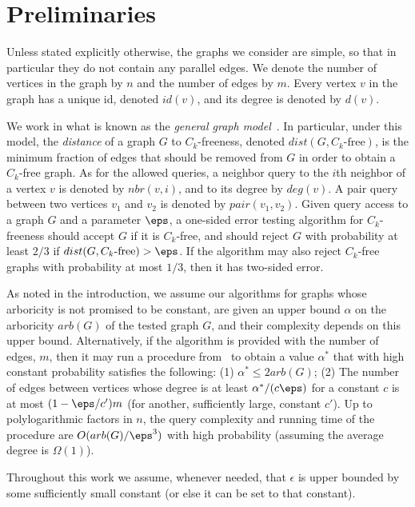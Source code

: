 \section{Preliminaries}\label{sec:prel}

Unless stated explicitly otherwise, the graphs we consider are simple, so that in particular they do not contain any parallel edges. We denote the number of vertices in the graph by $n$ and the number of edges by $m$. Every vertex $v$ in the graph has a unique id, denoted $id(v)$, and its degree is denoted by $d(v)$.

We work in what is known as the \emph{general graph model}~\cite{ParnasR02,KKR04}. In particular, under this model,
the \emph{distance} of a graph $G$ to $C_k$-freeness, denoted $dist(G,C_k\text{-free})$, is the minimum fraction of edges that should be  removed from $G$ in order to obtain a $C_k$-free graph.
As for the allowed queries, 
a neighbor query to the $i$th neighbor of a vertex $v$ is denoted by $nbr(v,i)$, and to its degree by $deg(v)$. A pair query between two vertices $v_1$ and $v_2$ is denoted by $pair(v_1,v_2)$.
Given query access to a graph $G$ and a parameter $\eps$, a one-sided error testing algorithm for $C_k$-freeness should accept $G$ if it is $C_k$-free, and should reject $G$ with probability at least $2/3$ if $dist(G,C_k\text{-free}) > \eps$.
If the algorithm may also reject $C_k$-free graphs with probability at most $1/3$, then it has two-sided error.

As noted in the introduction, we assume our algorithms for graphs whose arboricity is not promised to be constant,  are given an upper bound $\alpha$ on the arboricity $arb(G)$ of the tested  graph $G$, and their complexity depends on this upper bound. Alternatively, if the algorithm is provided with the number of edges, $m$, then it may run a procedure from~\cite{Reut} to obtain a value $\alpha^*$ that with high constant probability satisfies the following: (1) $\alpha^* \leq 2arb(G)$; (2) The number of edges between vertices whose degree is at least $\alpha^*/(c\eps)$ for a constant $c$ is at most $(1-\eps/c')m$ (for another, sufficiently large, constant $c'$).
Up to polylogarithmic factors in $n$, the query complexity and running time of the procedure are $O(arb(G)/\eps^3)$ with high probability (assuming the average degree is $\Omega(1)$). 


Throughout this work we assume, whenever needed, that $\epsilon$ is upper bounded by some sufficiently small constant (or else it can be set to that constant).

